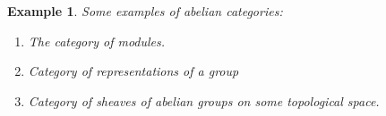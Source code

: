 \documentclass[12pt]{report}
\numberwithin{equation}{section}
\newtheorem{definition}[dummy]{Definition}
\newtheorem{example}[dummy]{Example}
\begin{document}
	\begin{example}Some examples of abelian categories:
		\begin{enumerate}
			\item The category of modules.
			\item Category of representations of a group
			\item Category of sheaves of abelian groups on some topological space.
			
%							

\end{enumerate}
\end{example}
\end{document}
